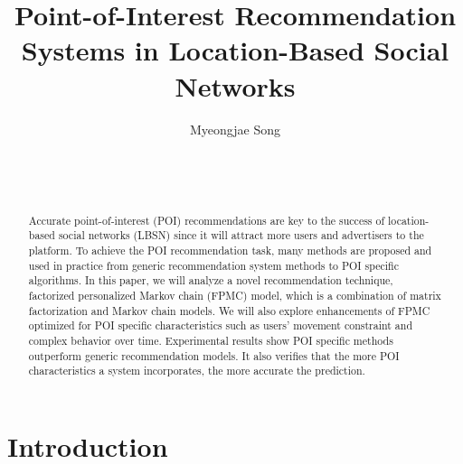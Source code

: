 \documentclass{sig-alternate}
\begin{document}

\title{Point-of-Interest Recommendation Systems in Location-Based Social Networks}


\author{
\alignauthor
Myeongjae Song\\
	\\
	\\
	\\
}

\maketitle
\begin{abstract}
Accurate point-of-interest (POI) recommendations are key to the success of 
location-based social networks (LBSN) since it will attract more users and advertisers 
to the platform. To achieve the POI recommendation task, many methods are proposed 
and used in practice from generic recommendation system methods to POI specific 
algorithms. In this paper, we will analyze a novel recommendation technique, 
factorized personalized Markov chain (FPMC) model, which is a combination of matrix 
factorization and Markov chain models. We will also explore enhancements of FPMC 
optimized for POI specific characteristics such as users' movement constraint and 
complex behavior over time. Experimental results show POI specific methods outperform 
generic recommendation models. It also verifies that the more POI characteristics a system incorporates, 
the more accurate the prediction.
\end{abstract}



\section{Introduction}
\label{sec:introduction}
\end{document}
